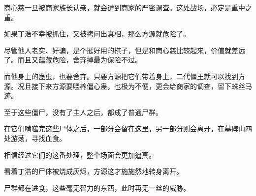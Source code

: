 \begin{this_body}
商心慈一旦被商家族长认亲，就会遭到商家的严密调查。这处战场，必定是重中之重。

如果丁浩不幸被抓住，又被拷问出真相，那么方源就危险了。

尽管他人老实、好骗，是个挺好用的棋子，但是和商心慈比较起来，价值就差远了。而且又蕴藏危险，舍弃掉最为保险不过。

而他身上的蛊虫，也要舍弃。只要方源把它们带着身上，二代僵王就可以找到方源。况且接下来方源要喂养僵心蛊，也极为不便，更会给商家的调查，留下蛛丝马迹。

至于这些僵尸，没有了主人之后，都成了普通尸群。

在它们啃噬完这些尸体之后，一部分会留在这里，另一部分则会离开，在墓碑山四处游荡，寻找血食。

相信经过它们的这番处理，整个场面会更加逼真。

看着丁浩的尸体被烧成灰烬，方源这才施施然地转身离开。

尸群都在进食，这些毫无智力的东西，此时再无一丝的威胁。

\end{this_body}


